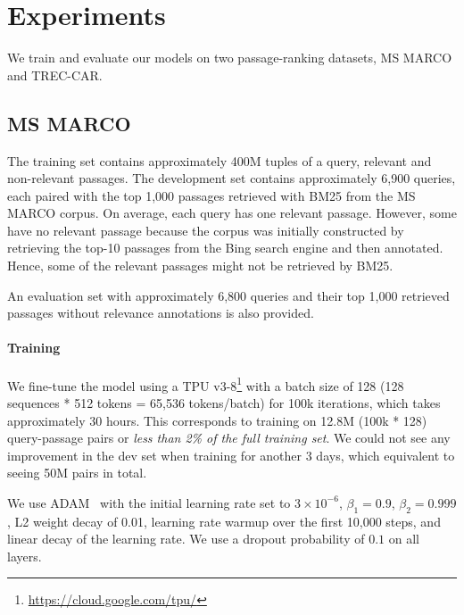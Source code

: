 \documentclass{article} %
\begin{document}
\section{Experiments}

We train and evaluate our models on two passage-ranking datasets, MS MARCO and TREC-CAR.

\subsection{MS MARCO}

The training set contains approximately 400M tuples of a query, relevant and non-relevant passages. The development set contains approximately 6,900 queries, each paired with the top 1,000 passages retrieved with BM25 from the MS MARCO corpus. On average, each query has one relevant passage. However, some have no relevant passage because the corpus was initially constructed by retrieving the top-10 passages from the Bing search engine and then annotated. Hence, some of the relevant passages might not be retrieved by BM25.

An evaluation set with approximately 6,800 queries and their top 1,000 retrieved passages without relevance annotations is also provided.

\paragraph{Training}

We fine-tune the model using a TPU v3-8\footnote{
\url{https://cloud.google.com/tpu/}
} 
with a batch size of 128 (128 sequences * 512 tokens = 65,536 tokens/batch) for 100k iterations, which takes approximately 30 hours. This corresponds to training on 12.8M (100k * 128) query-passage pairs or \textit{less than 2\% of the full training set}. We could not see any improvement in the dev set when training for another 3 days, which equivalent to seeing 50M pairs in total.

We use ADAM~\citep{kingma2014adam} with the initial learning rate set to $3 \times 10^{-6}$, $\beta_1 = 0.9$, $\beta_2 = 0.999$, L2 weight decay of 0.01, learning rate warmup over the first 10,000 steps, and linear decay of the learning rate. We use a dropout probability of $0.1$ on all layers.
\end{document}
